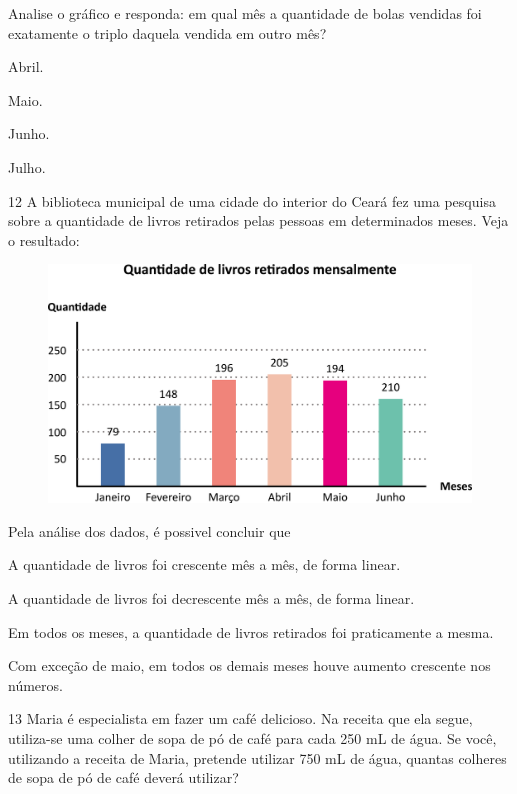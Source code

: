 Analise o gráfico e responda: em qual mês a quantidade de bolas vendidas foi exatamente o triplo daquela vendida em outro mês?

\begin{multicols}{2}
\begin{escolha}
\item
  Abril.
\item
  Maio.
\item
  Junho.
\item
  Julho.
\end{escolha}
\end{multicols}

\num{12} A biblioteca municipal de uma cidade do interior do Ceará fez uma pesquisa sobre a quantidade de livros retirados pelas pessoas em determinados meses. Veja o resultado:

\begin{figure}[htpb!]
\centering
\includegraphics[width=\textwidth]{./media/image106.png}
\end{figure}

Pela análise dos dados, é possivel concluir que

\begin{escolha}
\item
  A quantidade de livros foi crescente mês a mês, de forma linear.
\item
  A quantidade de livros foi decrescente mês a mês, de forma linear.
\item
  Em todos os meses, a quantidade de livros retirados foi praticamente a mesma.
\item
  Com exceção de maio, em todos os demais meses houve aumento crescente nos números.
\end{escolha}

\num{13} Maria é especialista em fazer um café delicioso. Na receita que ela segue, utiliza-se uma colher de sopa de pó de café para cada 250 mL de água. Se você, utilizando a receita de Maria, pretende utilizar 750 mL de água, quantas colheres de sopa de pó de café deverá utilizar?

